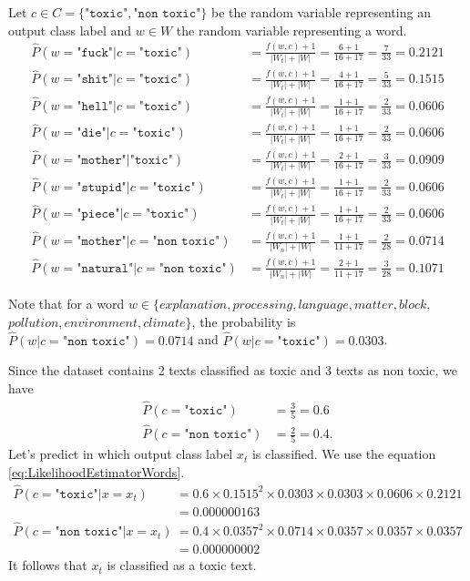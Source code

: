\documentclass{article}
\begin{document}
Let $c \in C = \{\texttt{"toxic"}, \texttt{"non toxic"}\}$ be the random variable representing an output class label and $w \in W$ the random variable representing a word.
\begin{align*}
	\widehat{P}(w = \texttt{"fuck"} | c = \texttt{"toxic"}) &= \frac{f(w, c)+1}{|W_t| + |W|} = \frac{6 + 1}{16 + 17} = \frac{7}{33} = 0.2121 \\
	\widehat{P}(w = \texttt{"shit"} | c = \texttt{"toxic"}) &= \frac{f(w, c)+1}{|W_t| + |W|} = \frac{4 + 1}{16 + 17} = \frac{5}{33} = 0.1515 \\
	\widehat{P}(w = \texttt{"hell"} | c = \texttt{"toxic"}) &= \frac{f(w, c)+1}{|W_t| + |W|} = \frac{1 + 1}{16 + 17} = \frac{2}{33} = 0.0606 \\
	\widehat{P}(w = \texttt{"die"} | c = \texttt{"toxic"}) &= \frac{f(w, c)+1}{|W_t| + |W|} = \frac{1 + 1}{16 + 17} = \frac{2}{33} = 0.0606 \\
	\widehat{P}(w = \texttt{"mother"} | \texttt{"toxic"}) &= \frac{f(w, c)+1}{|W_t| + |W|} = \frac{2 + 1}{16 + 17} = \frac{3}{33} = 0.0909 \\
	\widehat{P}(w = \texttt{"stupid"} | c = \texttt{"toxic"}) &= \frac{f(w, c)+1}{|W_t| + |W|} = \frac{1 + 1}{16 + 17} = \frac{2}{33} = 0.0606 \\
	\widehat{P}(w = \texttt{"piece"} | c = \texttt{"toxic"}) &= \frac{f(w, c)+1}{|W_t| + |W|} = \frac{1 + 1}{16 + 17} = \frac{2}{33} = 0.0606 \\
	\widehat{P}(w = \texttt{"mother"} | c = \texttt{"non toxic"}) &= \frac{f(w, c)+1}{|W_n| + |W|} = \frac{1 + 1}{11 + 17} = \frac{2}{28} = 0.0714 \\
	\widehat{P}(w = \texttt{"natural"} | c = \texttt{"non toxic"}) &= \frac{f(w, c)+1}{|W_n| + |W|} = \frac{2 + 1}{11 + 17} = \frac{3}{28} = 0.1071
\end{align*}

Note that for a word $w \in \{explanation, processing, language, matter, block, $ $pollution, environment, climate\}$, the probability is $\widehat{P}(w | c = \texttt{"non toxic"}) = 0.0714$ and $\widehat{P}(w | c = \texttt{"toxic"}) = 0.0303$.

Since the dataset contains 2 texts classified as toxic and 3 texts as non toxic, we have
\begin{align*}
	\widehat{P}(c = \texttt{"toxic"}) &= \frac{3}{5} = 0.6 \\
	\widehat{P}(c = \texttt{"non toxic"}) &= \frac{2}{5} = 0.4.
\end{align*}
Let's predict in which output class label $x_t$ is classified. We use the equation \eqref{eq:LikelihoodEstimatorWords}.
\begin{align*}
	\widehat{P}(c = \texttt{"toxic"} | x = x_t) &= 0.6 \times 0.1515^2 \times 0.0303 \times 0.0303 \times 0.0606 \times 0.2121 \\ &= 0.000000163 \\
	\widehat{P}(c = \texttt{"non toxic"} | x = x_t) &= 0.4 \times 0.0357^2 \times 0.0714 \times 0.0357 \times 0.0357 \times 0.0357 \\ &= 0.000000002
\end{align*}
It follows that $x_t$ is classified as a toxic text.
\end{document}
